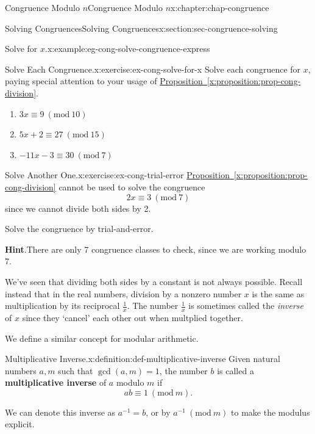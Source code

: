 \documentclass[oneside,10pt,]{book}
\newcommand{\blocktitlefont}{\relax}
\newcommand{\xreffont}{\relax}
\newcommand{\terminology}[1]{\textbf{#1}}
\numberwithin{equation}{section}
\newcommand{\Mod}[1]{\ \left(\mathrm{mod}\ #1\right)}
\begin{document}
\begin{chapterptx}{Congruence Modulo \(n\)}{}{Congruence Modulo \(n\)}{}{}{x:chapter:chap-congruence}
\begin{sectionptx}{Solving Congruences}{}{Solving Congruences}{}{}{x:section:sec-congruence-solving}
\begin{example}{Solve for \(x\).}{x:example:eg-cong-solve-congruence-express}
\end{example}
\begin{inlineexercise}{Solve Each Congruence.}{x:exercise:ex-cong-solve-for-x}%
Solve each congruence for \(x\), paying special attention to your usage of \hyperref[x:proposition:prop-cong-division]{Proposition~{\xreffont\ref{x:proposition:prop-cong-division}}}.%
\begin{enumerate}[label=(\alph*)]
\item{}\(\displaystyle 3x \equiv 9 \Mod{10}\)%
\item{}\(\displaystyle 5x + 2 \equiv 27 \Mod{15}\)%
\item{}\(\displaystyle -11x - 3 \equiv 30 \Mod{7}\)%
\end{enumerate}
%
\end{inlineexercise}
\begin{inlineexercise}{Solve Another One.}{x:exercise:ex-cong-trial-error}%
\hyperref[x:proposition:prop-cong-division]{Proposition~{\xreffont\ref{x:proposition:prop-cong-division}}} cannot be used to solve the congruence%
\begin{equation*}
2x \equiv 3 \Mod{7}
\end{equation*}
since we cannot divide both sides by 2.%
\par
Solve the congruence by trial-and-error.%
\par\smallskip%
\noindent\textbf{\blocktitlefont Hint}.\hypertarget{g:hint:id469326}{}\quad{}There are only 7 congruence classes to check, since we are working modulo 7.%
\end{inlineexercise}
We've seen that dividing both sides by a constant is not always possible. Recall instead that in the real numbers, division by a nonzero number \(x\) is the same as multiplication by its reciprocal \(\frac{1}{x}\). The number \(\frac{1}{x}\) is sometimes called the \emph{inverse} of \(x\) since they `cancel' each other out when multplied together.%
\par
We define a similar concept for modular arithmetic.%
\begin{definition}{Multiplicative Inverse.}{x:definition:def-multiplicative-inverse}%
Given natural numbers \(a, m\) such that \(\gcd(a,m) = 1\), the number \(b\) is called a \terminology{multiplicative inverse} of \(a\) modulo \(m\) if%
\begin{equation*}
ab \equiv 1 \Mod{m}\text{.}
\end{equation*}
%
\par
We can denote this inverse as \(a^{-1} = b\), or by \(a^{-1} \Mod{m}\) to make the modulus explicit.%

\end{definition}
\end{sectionptx}
\end{chapterptx}
\end{document}
